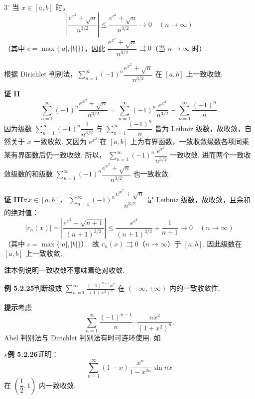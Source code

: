 \documentclass[UTF8, 12pt, fontset=fandol, oneside]{ctexart}
\begin{document}
$3^\circ$ 当 $x\in[a,b]$ 时，
\[
  \left|\frac{e^{x^2}+\sqrt n}{n^{3/2}}\right|
  \le\frac{e^{c^2}+\sqrt n}{n^{3/2}}\to0\quad(n\to\infty)
\]
（其中 $c=\max\{|a|,|b|\}$），因此
$\dfrac{e^{x^2}+\sqrt n}{n^{3/2}}\rightrightarrows0$（当 $n\to\infty$ 时）.

根据 Dirichlet 判别法，$\displaystyle\sum_{n=1}^{\infty}(-1)^n\dfrac{e^{x^2}+\sqrt n}{n^{3/2}}$
在 $[a,b]$ 上一致收敛.

\noindent\textbf{证 II}\quad
\[
  \sum_{n=1}^{\infty}(-1)^n\frac{e^{x^2}+\sqrt n}{n^{3/2}}
  =\sum_{n=1}^{\infty}(-1)^n\frac{e^{x^2}}{n^{3/2}}
  +\sum_{n=1}^{\infty}\frac{(-1)^n}{n}.
\]
因为级数 $\displaystyle\sum_{n=1}^{\infty}(-1)^n\dfrac1{n^{3/2}}$ 与
$\displaystyle\sum_{n=1}^{\infty}\dfrac{(-1)^n}{n}$ 皆为 Leibniz 级数，故收敛，自然关于
$x$ 一致收敛. 又因为 $e^{x^2}$ 在 $[a,b]$ 上为有界函数，一致收敛级数各项同乘某有界函数后仍一致收敛. 所以，
$\displaystyle\sum_{n=1}^{\infty}(-1)^n\dfrac{e^{x^2}}{n^{3/2}}$ 一致收敛. 进而两个一致收敛级数的和级数
$\displaystyle\sum_{n=1}^{\infty}(-1)^n\dfrac{e^{x^2}+\sqrt n}{n^{3/2}}$ 也一致收敛.

\noindent\textbf{证 III}\quad $\forall x\in[a,b]$，
$\displaystyle\sum_{n=1}^{\infty}(-1)^n\dfrac{e^{x^2}+\sqrt n}{n^{3/2}}$ 是 Leibniz 级数，故收敛，且余和的绝对值：
\[
  |r_n(x)|=\left|\frac{e^{x^2}+\sqrt{n+1}}{(n+1)^{3/2}}\right|
  \le\frac{e^{c^2}}{(n+1)^{3/2}}+\frac1{n+1}\to0\quad(n\to\infty)
\]
（其中 $c=\max\{|a|,|b|\}$）. 故 $r_n(x)\rightrightarrows0$（$n\to\infty$）于
$[a,b]$. 因此级数在 $[a,b]$ 上一致收敛.

\noindent\textbf{注}\quad 本例说明一致收敛不意味着绝对收敛.

\noindent\textbf{例 5.2.25}\quad 判断级数
$\displaystyle\sum_{n=1}^{\infty}\frac{(-1)^{n-1}x^2}{(1+x^2)^n}$ 在 $(-\infty,+\infty)$ 内的一致收敛性.

\noindent\textbf{提示}\quad 考虑
\[
  \sum_{n=1}^{\infty}\frac{(-1)^{n-1}}{n}\cdot\frac{nx^2}{(1+x^2)^n}.
\]
Abel 判别法与 Dirichlet 判别法有时可连环使用. 如

\noindent\textbf{$\star$例 5.2.26}\quad 证明：
\[
  \sum_{n=1}^{\infty}(1-x)\frac{x^n}{1-x^{2n}}\sin nx
\]
在 $\left(\dfrac12,1\right)$ 内一致收敛.
\end{document}
